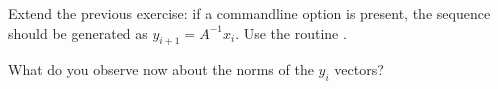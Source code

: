   Extend the previous exercise: if a commandline option 
  is present, the sequence should be generated as
  $y_{i+1}=A^{-1}x_i$. Use the routine .

  What do you observe now about the norms of the $y_i$ vectors?
